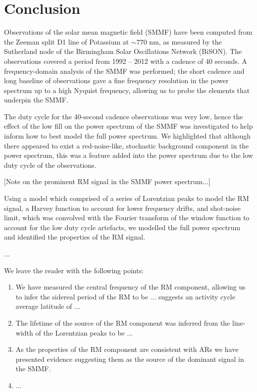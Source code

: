 \section{Conclusion}\label{sec:SMMF_conclusion}


Observations of the solar mean magnetic field (SMMF) have been computed from the Zeeman split D1 line of Potassium at $\sim 770$ nm, as measured by the Sutherland node of the Birmingham Solar Oscillations Network (BiSON). The observations covered a period from 1992 -- 2012 with a cadence of 40 seconds. A frequency-domain analysis of the SMMF was performed; the short cadence and long baseline of observations gave a fine frequency resolution in the power spectrum up to a high Nyquist frequency, allowing us to probe the elements that underpin the SMMF.

The duty cycle for the 40-second cadence observations was very low, hence the effect of the low fill on the power spectrum of the SMMF was investigated to help inform how to best model the full power spectrum. We highlighted that although there appeared to exist a red-noise-like, stochastic background component in the power spectrum, this was a feature added into the power spectrum due to the low duty cycle of the observations.

[Note on the prominent RM signal in the SMMF power spectrum...]

Using a model which comprised of a series of Lorentzian peaks to model the RM signal, a Harvey function to account for lower frequency drifts, and shot-noise limit, which was convolved with the Fourier transform of the window function to account for the low duty cycle artefacts, we modelled the full power spectrum and identified the properties of the RM signal.

...



We leave the reader with the following points:

\begin{enumerate}
	\item{We have measured the central frequency of the RM component, allowing us to infer the sidereal period of the RM to be ... suggests an activity cycle average latitude of ... }
	
	\item{The lifetime of the source of the RM component was inferred from the line-width of the Lorentzian peaks to be ...}
	
	\item{As the properties of the RM component are consistent with ARs we have presented evidence suggesting them as the source of the dominant signal in the SMMF.}
	
	\item{...}
\end{enumerate}

